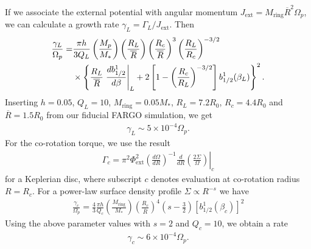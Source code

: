 If we associate the external potential with angular momentum 
$J_\mathrm{ext}  = M_\mathrm{ring}\overline{R}^2\Omega_p$, we can
calculate a growth rate $\gamma_L=\Gamma_L/J_\mathrm{ext}$. Then 
\begin{align}
  \frac{\gamma_L}{\Omega_p} = &\frac{\pi
    h}{3Q_L}\left(\frac{M_p}{M_*}\right)\left(\frac{R_L}{\overline{R}}\right)\left(\frac{R_c}{\overline{R}}\right) 
  ^3\left(\frac{R_L}{R_c}\right)^{-3/2}\notag\\ 
  &\times
  \left\{\frac{R_L}{\overline{R}}\left.\frac{db_{1/2}^1}{d\beta}\right|_L
    + 2\left[1 - 
      \left(\frac{R_c}{R_L}\right)^{-3/2}\right]b_{1/2}^1(\beta_L)\right\}^2. 
\end{align}
Inserting $h=0.05$, $Q_L=10$, $M_\mathrm{ring} = 0.05M_*$,
$R_L=7.2R_0$, $R_c=4.4R_0$ and $\overline{R}=1.5R_0$ from our fiducial
FARGO simulation, we get
\begin{align}
  \gamma_L \sim 5\times10^{-4}\Omega_p. 
\end{align}
For the co-rotation torque, we use the result
\begin{align}
  \Gamma_c = \left.
    \pi^2\Phi_\mathrm{ext}^2\left(\frac{d\Omega}{dR}\right)^{-1}\frac{d}{dR}\left(\frac{2\Sigma}{\Omega}\right)\right|_{c}     
\end{align}
for a Keplerian disc, where subscript $c$ denotes evaluation at
co-rotation radius $R=R_c$. For a power-law surface density profile
$\Sigma\propto R^{-s}$ we have
\begin{align}
\frac{\gamma_c}{\Omega_p} = \frac{4}{3}\frac{\pi h}{Q_c}
\left(\frac{M_\mathrm{ring}}{M_*}\right)\left(\frac{R_c}{\overline{R}}\right)^4\left(s-\frac{3}{2}\right) 
\left[b_{1/2}^1(\beta_c)\right]^2    
\end{align}
Using the above parameter values with $s=2$ and $Q_c=10$, we obtain a
rate
\begin{align}
  \gamma_c\sim 6\times 10^{-4}\Omega_p. 
\end{align}

